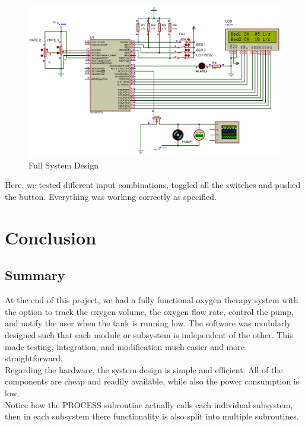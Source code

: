 \documentclass[a4paper, 12pt]{article}
\begin{document}
\begin{figure}[H]
\centering
\includegraphics[width=\linewidth]{images/FullSystem}
\caption{Full System Design}
\end{figure}

Here, we tested different input combinations, toggled all the switches and pushed the button. Everything was working correctly as specified.

\newpage

\section{Conclusion}

\subsection{Summary}
\par At the end of this project, we had a fully functional oxygen therapy system with the option to track the oxygen volume, the oxygen flow rate, control the pump, and notify the user when the tank is running low. The software was modularly designed such that each module or subsystem is independent of the other. This made testing, integration, and modification much easier and more straightforward. \\

Regarding the hardware, the system design is simple and efficient. All of the components are cheap and readily available, while also the power consumption is low. \\

Notice how the PROCESS subroutine actually calls each individual subsystem, then in each subsystem there functionality is also split into multiple subroutines. \\
\end{document}
